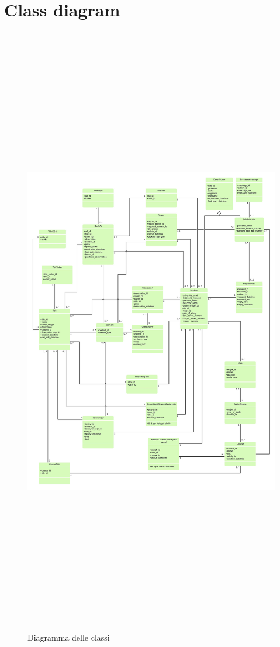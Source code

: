 \documentclass[10pt,a4paper]{report}
\begin{document}
	\section{Class diagram}
	\begin{figure}[H]
		\centering
		\includegraphics[height=27cm, width=17cm, keepaspectratio]{class_diagram}
		\caption{Diagramma delle classi}
	\end{figure}
	
\end{document}

